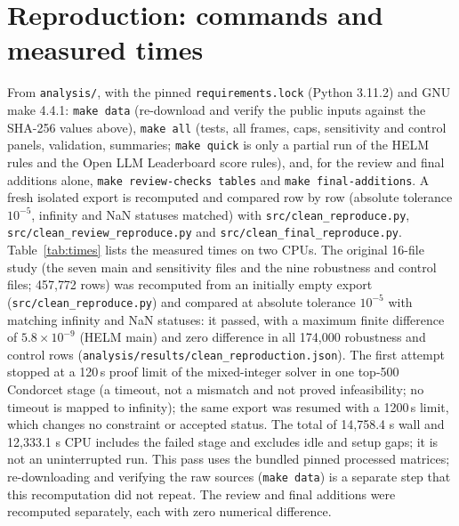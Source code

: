 \section{Reproduction: commands and measured times}
\label{app:repro}
From \texttt{analysis/}, with the pinned \texttt{requirements.lock} (Python 3.11.2) and GNU make 4.4.1: \texttt{make data} (re-download and verify the public inputs against the SHA-256 values above), \texttt{make all} (tests, all frames, caps, sensitivity and control panels, validation, summaries; \texttt{make quick} is only a partial run of the HELM rules and the Open LLM Leaderboard score rules), and, for the review and final additions alone, \texttt{make review-checks tables} and \texttt{make final-additions}. A fresh isolated export is recomputed and compared row by row (absolute tolerance $10^{-5}$, infinity and NaN statuses matched) with \texttt{src/clean\_reproduce.py}, \texttt{src/clean\_review\_reproduce.py} and \texttt{src/clean\_final\_reproduce.py}. Table~\ref{tab:times} lists the measured times on two CPUs. The original 16-file study (the seven main and sensitivity files and the nine robustness and control files; 457{,}772 rows) was recomputed from an initially empty export (\texttt{src/clean\_reproduce.py}) and compared at absolute tolerance $10^{-5}$ with matching infinity and NaN statuses: it passed, with a maximum finite difference of $5.8\times10^{-9}$ (HELM main) and zero difference in all 174{,}000 robustness and control rows (\texttt{analysis/results/clean\_reproduction.json}). The first attempt stopped at a 120\,s proof limit of the mixed-integer solver in one top-500 Condorcet stage (a timeout, not a mismatch and not proved infeasibility; no timeout is mapped to infinity); the same export was resumed with a 1200\,s limit, which changes no constraint or accepted status. The total of 14{,}758.4 s wall and 12{,}333.1 s CPU includes the failed stage and excludes idle and setup gaps; it is not an uninterrupted run. This pass uses the bundled pinned processed matrices; re-downloading and verifying the raw sources (\texttt{make data}) is a separate step that this recomputation did not repeat. The review and final additions were recomputed separately, each with zero numerical difference.

